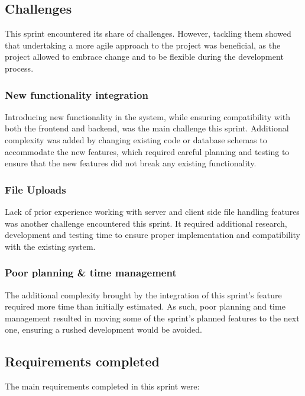 \subsection{Challenges}

This sprint encountered its share of challenges. However, tackling them showed that undertaking a more agile approach to the project was beneficial, as the project allowed to embrace change and to be flexible during the development process.

\subsubsection{New functionality integration}

Introducing new functionality in the system, while ensuring compatibility with both the frontend and backend, was the main challenge this sprint. Additional complexity was added by changing existing code or database schemas to accommodate the new features, which required careful planning and testing to ensure that the new features did not break any existing functionality.

\subsubsection{File Uploads}

Lack of prior experience working with server and client side file handling features was another challenge encountered this sprint. It required additional research, development and testing time to ensure proper implementation and compatibility with the existing system.

\subsubsection{Poor planning \& time management}

The additional complexity brought by the integration of this sprint's feature required more time than initially estimated. As such, poor planning and time management resulted in moving some of the sprint's planned features to the next one, ensuring a rushed development would be avoided.

\subsection{Requirements completed}

The main requirements completed in this sprint were:


